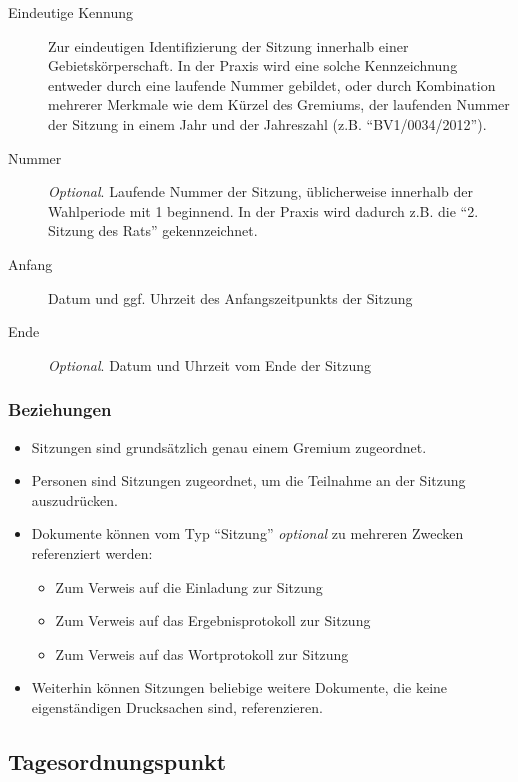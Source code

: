 \documentclass[,a4paper]{article}
\begin{document}
\begin{description}
\item[Eindeutige Kennung]
Zur eindeutigen Identifizierung der Sitzung innerhalb einer
Gebietskörperschaft. In der Praxis wird eine solche Kennzeichnung
entweder durch eine laufende Nummer gebildet, oder durch Kombination
mehrerer Merkmale wie dem Kürzel des Gremiums, der laufenden Nummer der
Sitzung in einem Jahr und der Jahreszahl (z.B. ``BV1/0034/2012'').
\item[Nummer]
\emph{Optional}. Laufende Nummer der Sitzung, üblicherweise innerhalb
der Wahlperiode mit 1 beginnend. In der Praxis wird dadurch z.B. die
``2. Sitzung des Rats'' gekennzeichnet.
\item[Anfang]
Datum und ggf. Uhrzeit des Anfangszeitpunkts der Sitzung
\item[Ende]
\emph{Optional}. Datum und Uhrzeit vom Ende der Sitzung
\end{description}

\subsubsection{Beziehungen}

\begin{itemize}
\item
  Sitzungen sind grundsätzlich genau einem Gremium zugeordnet.
\item
  Personen sind Sitzungen zugeordnet, um die Teilnahme an der Sitzung
  auszudrücken.
\item
  Dokumente können vom Typ ``Sitzung'' \emph{optional} zu mehreren
  Zwecken referenziert werden:

  \begin{itemize}
  \item
    Zum Verweis auf die Einladung zur Sitzung
  \item
    Zum Verweis auf das Ergebnisprotokoll zur Sitzung
  \item
    Zum Verweis auf das Wortprotokoll zur Sitzung
  \end{itemize}
\item
  Weiterhin können Sitzungen beliebige weitere Dokumente, die keine
  eigenständigen Drucksachen sind, referenzieren.
\end{itemize}

\subsection{Tagesordnungspunkt}
\end{document}
